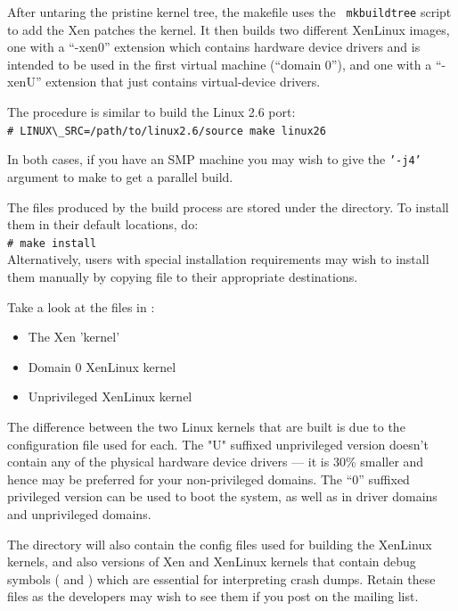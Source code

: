 \documentclass[11pt,twoside,final,openright]{xenstyle}
\begin{document}
After untaring the pristine kernel tree, the makefile uses the {\tt
mkbuildtree} script to add the Xen patches the kernel. It then builds
two different XenLinux images, one with a ``-xen0'' extension which
contains hardware device drivers and is intended to be used in the
first virtual machine (``domain 0''), and one with a ``-xenU''
extension that just contains virtual-device drivers.

The procedure is similar to build the Linux 2.6 port: \\
\verb!# LINUX\_SRC=/path/to/linux2.6/source make linux26!

In both cases, if you have an SMP machine you may wish to give the
{\tt '-j4'} argument to make to get a parallel build.

The files produced by the build process are stored under the
 directory.  To install them in their default
locations, do: \\
\verb_# make install_\\

Alternatively, users with special installation requirements may wish
to install them manually by copying file to their appropriate
destinations.

Take a look at the files in :
\begin{itemize}
\item {} The Xen 'kernel'
\item {}  Domain 0 XenLinux kernel
\item {}  Unprivileged XenLinux kernel
\end{itemize}

The difference between the two Linux kernels that are built is due to
the configuration file used for each. The "U" suffixed unprivileged
version doesn't contain any of the physical hardware device drivers
--- it is 30\% smaller and hence may be preferred for your
non-privileged domains.  The ``0'' suffixed privileged version can be
used to boot the system, as well as in driver domains and unprivileged
domains.

The  directory will also contain the config files
used for building the XenLinux kernels, and also versions of Xen and
XenLinux kernels that contain debug symbols ( and
) which are essential for interpreting crash
dumps.  Retain these files as the developers may wish to see them if
you post on the mailing list.
\end{document}
